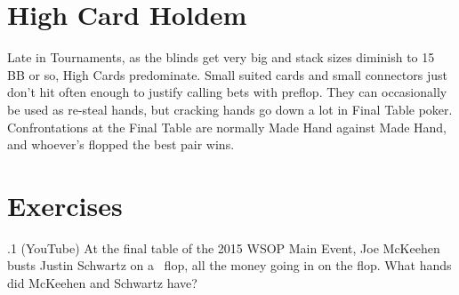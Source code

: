 \section{High Card Holdem}

Late in Tournaments, as the blinds get very big and stack sizes diminish
to 15 BB or so, High Cards predominate. Small suited cards and small
connectors just don't hit often enough to justify calling bets with
preflop. They can occasionally be used as re-steal hands, but cracking
hands go down a lot in Final Table poker. Confrontations at the Final
Table are normally Made Hand against Made Hand, and whoever's flopped
the best pair wins.

\section{Exercises}


.1 (YouTube) At the final table of the 2015 WSOP Main
Event, Joe McKeehen busts Justin Schwartz on a \sixh\tred\twod\ flop,
all the money going in on the flop. What hands did McKeehen and
Schwartz have?
